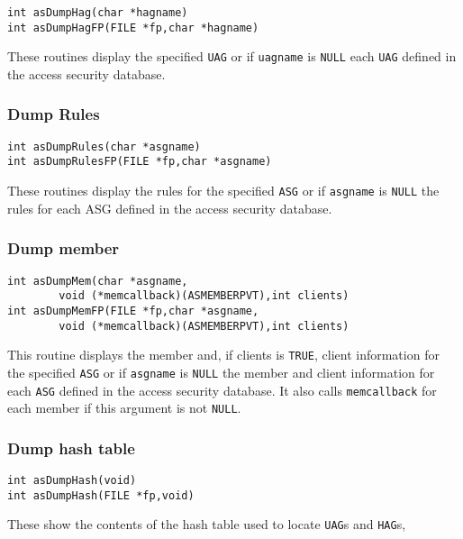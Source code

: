 \begin{verbatim}
int asDumpHag(char *hagname)
int asDumpHagFP(FILE *fp,char *hagname)
\end{verbatim}

These routines display the specified \verb|UAG| or if \verb|uagname| is \verb|NULL| each \verb|UAG| defined in the access security database.

\subsubsection{Dump Rules}

\begin{verbatim}
int asDumpRules(char *asgname)
int asDumpRulesFP(FILE *fp,char *asgname)
\end{verbatim}

These routines display the rules for the specified \verb|ASG| or if \verb|asgname| is \verb|NULL| the rules for each ASG defined in the 
access security database.

\subsubsection{Dump member}

\begin{verbatim}
int asDumpMem(char *asgname,
        void (*memcallback)(ASMEMBERPVT),int clients)
int asDumpMemFP(FILE *fp,char *asgname,
        void (*memcallback)(ASMEMBERPVT),int clients)
\end{verbatim}

This routine displays the member and, if clients is \verb|TRUE|, client information for the specified \verb|ASG| or if \verb|asgname| is \verb|NULL| the member and client information for each \verb|ASG| defined in the access security database.
It also calls \verb|memcallback| for each member if this argument is not \verb|NULL|.

\subsubsection{Dump hash table}

\begin{verbatim}
int asDumpHash(void)
int asDumpHash(FILE *fp,void)
\end{verbatim}

These show the contents of the hash table used to locate \verb|UAG|s and \verb|HAG|s,

